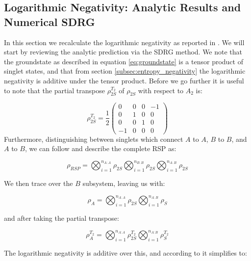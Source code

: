 \subsection{Logarithmic Negativity: Analytic Results and Numerical SDRG}\label{subsec:baseline_negativity}
In this section we recalculate the logarithmic negativity as reported in \cite{paola2016}. We will start by reviewing the analytic prediction via the SDRG method. We note that the groundstate as described in equation \ref{eq:groundstate} is a tensor product of singlet states, and that from section \ref{subsec:entropy_negativity} the logarithmic negativity is additive under the tensor product. Before we go further it is useful to note that the partial transpose $\rho_{2 S}^{T_2}$ of $\rho_{2S}$ with respect to $A_2$ is:

\begin{equation}
\rho_{2 S}^{T_2}=\frac{1}{2}\left(\begin{array}{cccc}
0 & 0 & 0 & -1 \\
0 & 1 & 0 & 0 \\
0 & 0 & 1 & 0 \\
-1 & 0 & 0 & 0
\end{array}\right)
\end{equation}
Furthermore, distinguishing between singlets which connect $A$ to $A$, $B$ to $B$, and $A$ to $B$, we can follow \cite{paola2016} and describe the complete RSP as:

\begin{equation}
\rho_{R S P}=\bigotimes_{i=1}^{n_{A: A}} \rho_{2 S} \bigotimes_{i=1}^{n_{B: B}} \rho_{2 S} \bigotimes_{i=1}^{n_{A: B}} \rho_{2 S}
\end{equation}

We then trace over the $B$ subsystem, leaving us with:

\begin{equation}
\rho_A=\bigotimes_{i=1}^{n_{A: A}} \rho_{2 S} \bigotimes_{i=1}^{n_{A: B}} \rho_S
\end{equation}

and after taking the partial transpose:

\begin{equation}
\rho_A^{T_2}=\bigotimes_{i=1}^{n_{A: A}} \rho_{2 S}^{T_2} \bigotimes_{i=1}^{n_{A: B}} \rho_S^{T_2}
\end{equation}

The logarithmic negativity is additive over this, and according to \cite{paola2016} it simplifies to:

